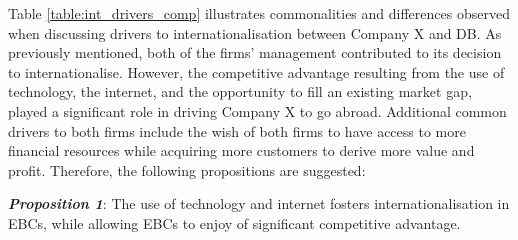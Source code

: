 \documentclass[11pt,a4paper]{article}
\begin{document}
{{{Table \ref{table:int_drivers_comp} illustrates commonalities and differences observed when discussing drivers to internationalisation between Company X and DB. As previously mentioned, both of the firms' management contributed to its decision to internationalise. However, the competitive advantage resulting from the use of technology, the internet, and the opportunity to fill an existing market gap, played a significant role in driving Company X to go abroad. Additional common drivers to both firms include the wish of both firms to have access to more financial  resources while acquiring more customers to derive more value and profit. Therefore, the following propositions are suggested:
\begin{center}
\textbf{\textit{Proposition 1}}: The use of technology and internet fosters internationalisation in EBCs, while allowing EBCs to enjoy of significant competitive advantage.
\end{center}


}}}
\end{document}
